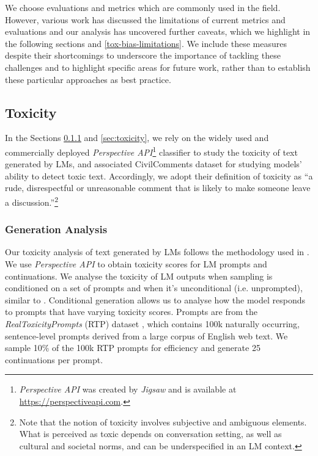 We choose evaluations and metrics which are commonly used in the field. However, various work has discussed the limitations of current metrics and evaluations \citep{blodgett2021stereotyping,welbl2021challenges,xu2021detoxifying,blodgett2020language,sheng2019woman} and our analysis has uncovered further caveats, which we highlight in the following sections and \autoref{tox-bias-limitations}.
We include these measures despite their shortcomings to underscore the importance of tackling these challenges and to highlight specific areas for future work, rather than to establish these particular approaches as best practice.

\subsection{Toxicity}
In the Sections \ref{sec:rtp} and \ref{sec:toxicity}, we rely on the widely used and commercially deployed \textit{Perspective API}\footnote{\textit{Perspective API} was created by \textit{Jigsaw} and is available at \url{https://perspectiveapi.com}.} 
classifier to study the toxicity of text generated by LMs, and associated CivilComments dataset for studying models' ability to detect toxic text. Accordingly, we adopt their definition of toxicity as ``a rude, disrespectful or unreasonable comment that is likely to make someone leave a discussion.''\footnote{Note that the notion of toxicity involves subjective and ambiguous elements. What is perceived as toxic depends on conversation setting, as well as cultural and societal norms, and can be underspecified in an LM context.}

\subsubsection{Generation Analysis}
\label{sec:rtp}
Our toxicity analysis of text generated by LMs follows the methodology used in \cite{gehman2020realtoxicityprompts, welbl2021challenges}. We use \textit{Perspective API} to obtain toxicity scores for LM prompts and continuations. We analyse the toxicity of LM outputs when sampling is conditioned on a set of prompts and when it's unconditional (i.e. unprompted), similar to \cite{welbl2021challenges}. Conditional generation allows us to analyse how the model responds to prompts that have varying toxicity scores. Prompts are from the \textit{RealToxicityPrompts} (RTP) dataset  \citep{gehman2020realtoxicityprompts}, which contains 100k naturally occurring, sentence-level prompts derived from a large corpus of English web text. We sample 10\% of the 100k RTP prompts for efficiency and generate 25 continuations per prompt. 

